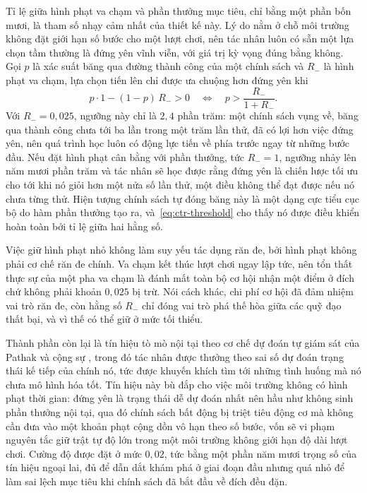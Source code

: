 \indent Tỉ lệ giữa hình phạt va chạm và phần thưởng mục tiêu, chỉ bằng một phần bốn
mươi, là tham số nhạy cảm nhất của thiết kế này. Lý do nằm ở chỗ môi trường không đặt
giới hạn số bước cho một lượt chơi, nên tác nhân luôn có sẵn một lựa chọn tầm thường là
đứng yên vĩnh viễn, với giá trị kỳ vọng đúng bằng không. Gọi $p$ là xác suất băng qua
đường thành công của một chính sách và $R_{-}$ là hình phạt va chạm, lựa chọn tiến lên
chỉ được ưa chuộng hơn đứng yên khi
\begin{equation}
p \cdot 1 - (1-p)\,R_{-} > 0
\quad\Longleftrightarrow\quad
p > \frac{R_{-}}{1 + R_{-}} .
\label{eq:ctr-threshold}
\end{equation}
Với $R_{-} = 0{,}025$, ngưỡng này chỉ là $2{,}4$ phần trăm: một chính sách vụng về, băng
qua thành công chưa tới ba lần trong một trăm lần thử, đã có lợi hơn việc đứng yên, nên
quá trình học luôn có động lực tiến về phía trước ngay từ những bước đầu. Nếu đặt hình
phạt cân bằng với phần thưởng, tức $R_{-} = 1$, ngưỡng nhảy lên năm mươi phần trăm và
tác nhân sẽ học được rằng đứng yên là chiến lược tối ưu cho tới khi nó giỏi hơn một nửa
số lần thử, một điều không thể đạt được nếu nó chưa từng thử. Hiện tượng chính sách tự
đóng băng này là một dạng cực tiểu cục bộ do hàm phần thưởng tạo ra, và~\eqref{eq:ctr-threshold}
cho thấy nó được điều khiển hoàn toàn bởi tỉ lệ giữa hai hằng số.

\indent Việc giữ hình phạt nhỏ không làm suy yếu tác dụng răn đe, bởi hình phạt không
phải cơ chế răn đe chính. Va chạm kết thúc lượt chơi ngay lập tức, nên tổn thất
thực sự của một pha va chạm là đánh mất toàn bộ cơ hội nhận một điểm ở đích chứ không
phải khoản $0{,}025$ bị trừ. Nói cách khác, chi phí cơ hội đã đảm nhiệm vai trò răn đe,
còn hằng số $R_{-}$ chỉ đóng vai trò phá thế hòa giữa các quỹ đạo thất bại, và vì thế có
thể giữ ở mức tối thiểu.

\indent Thành phần còn lại là tín hiệu tò mò nội tại theo cơ chế dự đoán tự giám sát của
Pathak và cộng sự \cite{pathak2017curiosity}, trong đó tác nhân được thưởng theo sai số
dự đoán trạng thái kế tiếp của chính nó, tức được khuyến khích tìm tới những tình huống
mà nó chưa mô hình hóa tốt. Tín hiệu này bù đắp cho việc môi trường không có hình phạt
thời gian: đứng yên là trạng thái dễ dự đoán nhất nên hầu như không sinh phần thưởng nội
tại, qua đó chính sách bất động bị triệt tiêu động cơ mà không cần đưa vào một khoản phạt
cộng dồn vô hạn theo số bước, vốn sẽ vi phạm nguyên tắc giữ trật tự độ lớn trong một môi
trường không giới hạn độ dài lượt chơi. Cường độ được đặt ở mức $0{,}02$, tức bằng một
phần năm mươi trọng số của tín hiệu ngoại lai, đủ để dẫn dắt khám phá ở giai đoạn đầu
nhưng quá nhỏ để làm sai lệch mục tiêu khi chính sách đã bắt đầu về đích đều đặn.

